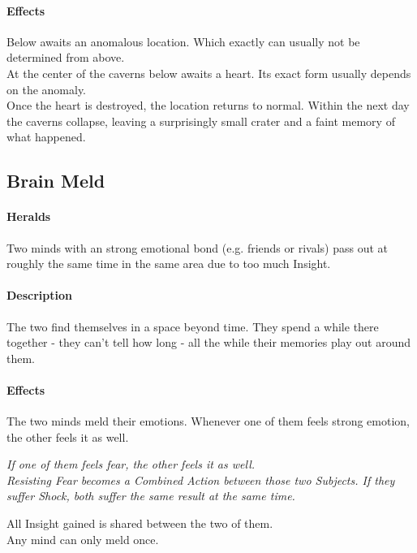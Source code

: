 \paragraph{Effects}
Below awaits an anomalous location.
Which exactly can usually not be determined from above.
\\%
At the center of the caverns below awaits a heart.
Its exact form usually depends on the anomaly.
\\%
Once the heart is destroyed,
	the location returns to normal.
Within the next day the caverns collapse,
	leaving a surprisingly small crater
	and a faint memory of what happened.
\subsection*{Brain Meld}
\paragraph{Heralds}
Two minds with an strong emotional bond (e.g. friends or rivals) pass out
	at roughly the same time
	in the same area
	due to too much Insight.
\paragraph{Description}
The two find themselves in a space beyond time.
They spend a while there together
	- they can't tell how long -
	all the while their memories play out around them.
\paragraph{Effects}
The two minds meld their emotions.
Whenever one of them feels strong emotion,
the other feels it as well.
\begin{exampleblock}
	\itshape
	If one of them feels fear,
	the other feels it as well.
	\\%
	Resisting Fear becomes a Combined Action between those two Subjects.
	If they suffer Shock, both suffer the same result at the same time.
\end{exampleblock}
All Insight gained is shared between the two of them.
\\%
Any mind can only meld once.
